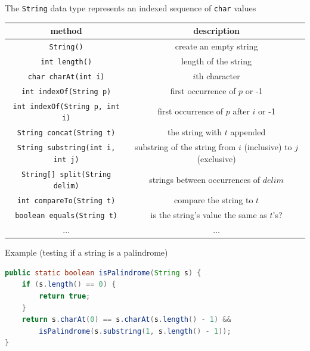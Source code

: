 \documentclass[8pt,a4paper,compress]{beamer}
\begin{document}
\begin{frame}[fragile]
\pause
The \lstinline{String} data type represents an indexed sequence of \lstinline{char} values

\begin{center}
\begin{tabular}{cc}
method & description \\ \hline
\lstinline$String()$ & create an empty string \\
\lstinline$int length()$ & length of the string \\
\lstinline$char charAt(int i)$ & $i$th character \\
\lstinline$int indexOf(String p)$ & first occurrence of $p$ or -1 \\ \lstinline$int indexOf(String p, int i)$ & first occurrence of $p$ after $i$ or -1 \\
\lstinline$String concat(String t)$ & the string with $t$ appended \\
\lstinline$String substring(int i, int j)$ & substring of the string from $i$ (inclusive) to $j$ (exclusive) \\
\lstinline$String[] split(String delim)$ & strings between occurrences of $delim$ \\
\lstinline$int compareTo(String t)$ & compare the string to $t$ \\
\lstinline$boolean equals(String t)$ & is the string's value the same as $t$'s? \\
$\dots$ & $\dots$
\end{tabular} 
\end{center}

\pause
\bigskip

Example (testing if a string is a palindrome)
\begin{lstlisting}[language=Java]
public static boolean isPalindrome(String s) {
    if (s.length() == 0) {
        return true;
    } 
    return s.charAt(0) == s.charAt(s.length() - 1) && 
        isPalindrome(s.substring(1, s.length() - 1));
}
\end{lstlisting}
\end{frame}
\end{document}

